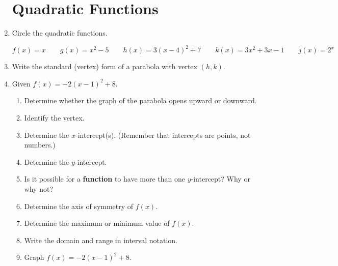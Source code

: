 \documentclass[11pt]{article}
\begin{document}
\begin{enumerate}
\begin{enumerate}
\end{enumerate}

\newpage
\section{Quadratic Functions}
\item Circle the quadratic functions.

$$f(x)=x \quad \quad g(x)=x^2-5 \quad \quad h(x)=3(x-4)^2+7  \quad \quad k(x)=3x^2+3x-1 \quad \quad j(x)=2^x$$


\item Write the standard (vertex) form of a parabola with vertex $(h,k)$.\\[.2in]

\item Given $f(x)=-2(x-1)^2+8$.

\begin{enumerate}

\item Determine whether the graph of the parabola opens upward or downward.\\[.2in]

\item Identify the vertex.\\[.2in]

\item Determine the $x$-intercept(s). (Remember that intercepts are points, not numbers.)
\vfill
\item Determine the $y$-intercept.
\vfill
\item Is it possible for a \textbf{function} to have more than one $y$-intercept?  Why or why not?\\[.2in]


\newpage
\item Determine the axis of symmetry of $f(x)$.\\[.2in]
\item Determine the maximum or minimum value of $f(x)$.
\vfill
\item Write the domain and range in interval notation.\\[.4in]
\item Graph $f(x)=-2(x-1)^2+8$.\\
\end{enumerate}
\end{enumerate}
\end{document}
